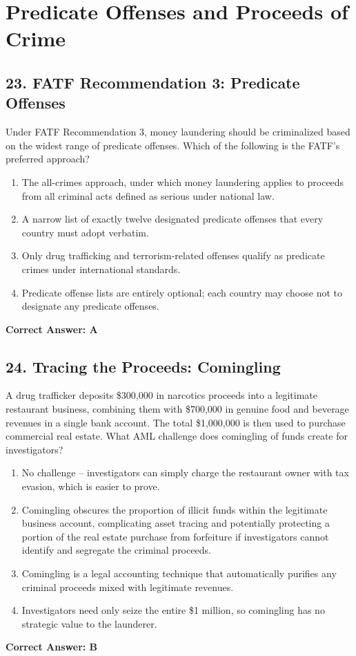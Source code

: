 \documentclass[11pt,a4paper]{article}
\begin{document}
	\section{Predicate Offenses and Proceeds of Crime}
	
	\subsection{23. FATF Recommendation 3: Predicate Offenses}
	Under FATF Recommendation 3, money laundering should be criminalized based on the widest range of predicate offenses. Which of the following is the FATF's preferred approach?
	\begin{enumerate}[label=\Alph*.]
		\item The all-crimes approach, under which money laundering applies to proceeds from all criminal acts defined as serious under national law.
		\item A narrow list of exactly twelve designated predicate offenses that every country must adopt verbatim.
		\item Only drug trafficking and terrorism-related offenses qualify as predicate crimes under international standards.
		\item Predicate offense lists are entirely optional; each country may choose not to designate any predicate offenses.
	\end{enumerate}
	\textbf{Correct Answer: A}
	
	\subsection{24. Tracing the Proceeds: Comingling}
	A drug trafficker deposits \$300,000 in narcotics proceeds into a legitimate restaurant business, combining them with \$700,000 in genuine food and beverage revenues in a single bank account. The total \$1,000,000 is then used to purchase commercial real estate. What AML challenge does comingling of funds create for investigators?
	\begin{enumerate}[label=\Alph*.]
		\item No challenge -- investigators can simply charge the restaurant owner with tax evasion, which is easier to prove.
		\item Comingling obscures the proportion of illicit funds within the legitimate business account, complicating asset tracing and potentially protecting a portion of the real estate purchase from forfeiture if investigators cannot identify and segregate the criminal proceeds.
		\item Comingling is a legal accounting technique that automatically purifies any criminal proceeds mixed with legitimate revenues.
		\item Investigators need only seize the entire \$1 million, so comingling has no strategic value to the launderer.
	\end{enumerate}
	\textbf{Correct Answer: B}
	
\end{document}
